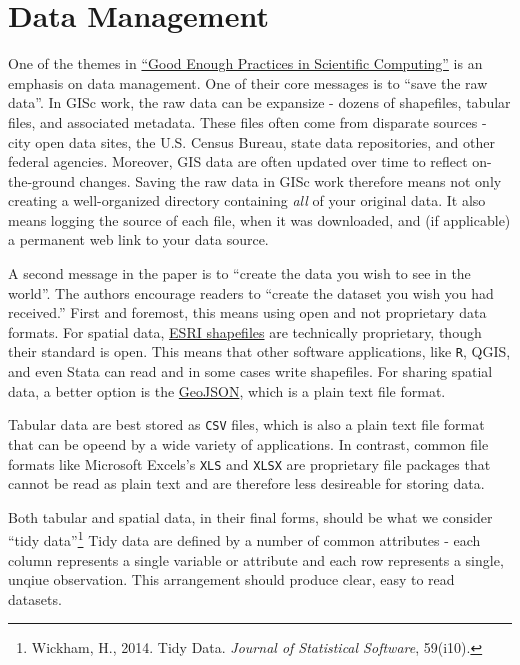 \documentclass[]{book}
\let\rmarkdownfootnote\footnote%
\def\footnote{\protect\rmarkdownfootnote}
\begin{document}
\section{Data Management}\label{data-management}

One of the themes in \href{https://arxiv.org/abs/1609.00037}{``Good
Enough Practices in Scientific Computing''} is an emphasis on data
management. One of their core messages is to ``save the raw data''. In
GISc work, the raw data can be expansize - dozens of shapefiles, tabular
files, and associated metadata. These files often come from disparate
sources - city open data sites, the U.S. Census Bureau, state data
repositories, and other federal agencies. Moreover, GIS data are often
updated over time to reflect on-the-ground changes. Saving the raw data
in GISc work therefore means not only creating a well-organized
directory containing \emph{all} of your original data. It also means
logging the source of each file, when it was downloaded, and (if
applicable) a permanent web link to your data source.

A second message in the paper is to ``create the data you wish to see in
the world''. The authors encourage readers to ``create the dataset you
wish you had received.'' First and foremost, this means using open and
not proprietary data formats. For spatial data,
\href{https://en.wikipedia.org/wiki/Shapefile}{ESRI shapefiles} are
technically proprietary, though their standard is open. This means that
other software applications, like \texttt{R}, QGIS, and even Stata can
read and in some cases write shapefiles. For sharing spatial data, a
better option is the
\href{https://en.wikipedia.org/wiki/GeoJSON}{GeoJSON}, which is a plain
text file format.

Tabular data are best stored as \texttt{CSV} files, which is also a
plain text file format that can be opeend by a wide variety of
applications. In contrast, common file formats like Microsoft Excels's
\texttt{XLS} and \texttt{XLSX} are proprietary file packages that cannot
be read as plain text and are therefore less desireable for storing
data.

Both tabular and spatial data, in their final forms, should be what we
consider ``tidy data''\footnote{Wickham, H., 2014. Tidy Data.
  \emph{Journal of Statistical Software}, 59(i10).} Tidy data are
defined by a number of common attributes - each column represents a
single variable or attribute and each row represents a single, unqiue
observation. This arrangement should produce clear, easy to read
datasets.
\end{document}
